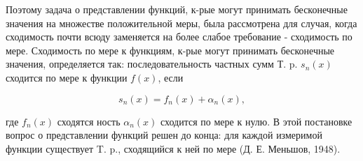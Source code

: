 \documentclass[10pt]{article}
\begin{document}
Поэтому задача о представлении функций, к-рые могут принимать бесконечные значения на множестве положительной меры, была рассмотрена для случая, когда сходимость почти всюду заменяется на более слабое требование - сходимость по мере. Сходимость по мере к функциям, к-рые могут принимать бесконечные значения, определяется так: последовательность частных сумм Т. p. $s_{n}(x)$ сходится по мере к функции $f(x)$, если



\[

s_{n}(x)=f_{n}(x)+\alpha_{n}(x),

\]



где $f_{n}(x)$ сходятся ность $\alpha_{n}(x)$ сходится по мере к нулю. В этой постановке вопрос о представлении функций решен до конца: для каждой измеримой функции существует T. p., сходящийся к ней по мере (Д. Е. Меньшов, 1948).
\end{document}
